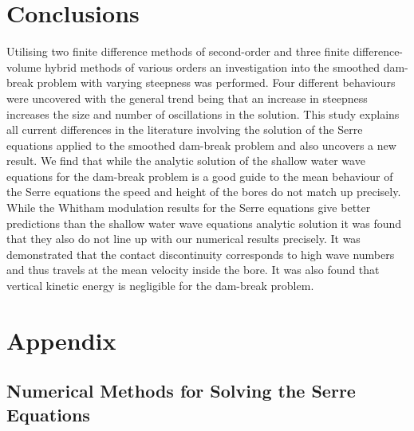 \documentclass[SingleSpace,12pt,Proceedings]{Serre_ASCE}
\begin{document}
\section{Conclusions}
\label{section:Conclusions}
Utilising two finite difference methods of second-order and three finite difference-volume hybrid methods of various orders an investigation into the smoothed dam-break problem with varying steepness was performed. Four different behaviours were uncovered with the general trend being that an increase in steepness increases the size and number of oscillations in the solution. This study explains all current differences in the literature involving the solution of the Serre equations applied to the smoothed dam-break problem and also uncovers a new result. We find that while the analytic solution of the shallow water wave equations for the dam-break problem is a good guide to the mean behaviour of the Serre equations the speed and height of the bores do not match up precisely. While the Whitham modulation results for the Serre equations give better predictions than the shallow water wave equations analytic solution it was found that they also do not line up with our numerical results precisely. It was demonstrated that the contact discontinuity corresponds to high wave numbers and thus travels at the mean velocity inside the bore. It was also found that vertical kinetic energy is negligible for the dam-break problem. 




\section{Appendix}
\subsection{Numerical Methods for Solving the Serre Equations} 
\label{sec:DirNumMet}
\end{document}
